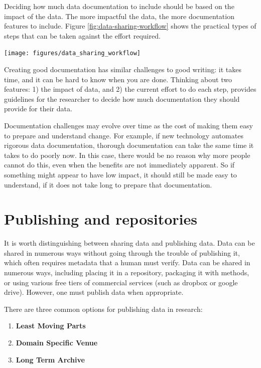 \documentclass[
]{article}
\providecommand{\tightlist}{%
  \setlength{\itemsep}{0pt}\setlength{\parskip}{0pt}}
\let\origfigure\figure
\let\endorigfigure\endfigure
\renewenvironment{figure}[1][2] {
    \expandafter\origfigure\expandafter[H]
} {
    \endorigfigure
}
\begin{document}
Deciding how much data documentation to include should be based on the impact of the data. The more impactful the data, the more documentation features to include. Figure \ref{fig:data-sharing-workflow} shows the practical types of steps that can be taken against the effort required.

\begin{figure}
\texttt{[image: figures/data\_sharing\_workflow]} \caption{The steps required compared to effort required for data sharing for reproducibility.}\label{fig:data-sharing-workflow}
\end{figure}

Creating good documentation has similar challenges to good writing: it takes time, and it can be hard to know when you are done. Thinking about two features: 1) the impact of data, and 2) the current effort to do each step, provides guidelines for the researcher to decide how much documentation they should provide for their data.

Documentation challenges may evolve over time as the cost of making them easy to prepare and understand change. For example, if new technology automates rigorous data documentation, thorough documentation can take the same time it takes to do poorly now. In this case, there would be no reason why more people cannot do this, even when the benefits are not immediately apparent. So if something might appear to have low impact, it should still be made easy to understand, if it does not take long to prepare that documentation.

\hypertarget{publish-repos}{%
\section{Publishing and repositories}\label{publish-repos}}

It is worth distinguishing between sharing data and publishing data. Data can be shared in numerous ways without going through the trouble of publishing it, which often requires metadata that a human must verify. Data can be shared in numerous ways, including placing it in a repository, packaging it with methods, or using various free tiers of commercial services (such as dropbox or google drive). However, one must publish data when appropriate.

There are three common options for publishing data in research:

\begin{enumerate}
\def\labelenumi{\arabic{enumi}.}
\tightlist
\item
  \textbf{Least Moving Parts}
\item
  \textbf{Domain Specific Venue}
\item
  \textbf{Long Term Archive}
\end{enumerate}
\end{document}
